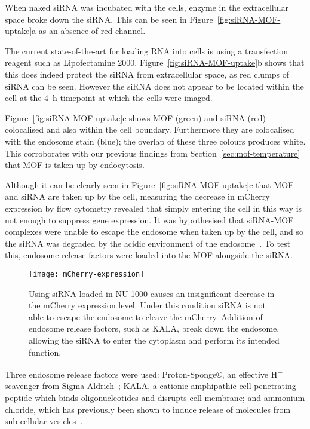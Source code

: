 When naked siRNA was incubated with the cells, enzyme in the extracellular space broke down the siRNA. 
This can be seen in Figure~\ref{fig:siRNA-MOF-uptake}a as an absence of red channel. 

The current state-of-the-art for loading RNA into cells is using a transfection reagent such as Lipofectamine 2000. 
Figure~\ref{fig:siRNA-MOF-uptake}b shows that this does indeed protect the siRNA from extracellular space, as red clumps of siRNA can be seen. 
However the siRNA does not appear to be located within the cell at the \SI{4}{\hour} timepoint at which the cells were imaged. 

Figure~\ref{fig:siRNA-MOF-uptake}c shows MOF (green) and siRNA (red) colocalised and also within the cell boundary. 
Furthermore they are colocalised with the endosome stain (blue); the overlap of these three colours produces white. 
This corroborates with our previous findings from Section~\ref{sec:mof-temperature} that MOF is taken up by endocytosis. 

Although it can be clearly seen in Figure~\ref{fig:siRNA-MOF-uptake}c that MOF and siRNA are taken up by the cell, measuring the decrease in mCherry expression by flow cytometry revealed that simply entering the cell in this way is not enough to suppress gene expression. 
It was hypothesised that siRNA-MOF complexes were unable to escape the endosome when taken up by the cell, and so the siRNA was degraded by the acidic environment of the endosome~\cite{geisow1984ph}. 
To test this, endosome release factors were loaded into the MOF alongside the siRNA. 

\begin{figure}[htbp!]
\centering
\texttt{[image: mCherry-expression]}
\caption[MOFs: siRNA suppresses mCherry expression when an endosome release factor is loaded to MOFs]{ Using siRNA loaded in NU-1000 causes an insignificant decrease in the mCherry expression level. Under this condition siRNA is not able to escape the endosome to cleave the mCherry. Addition of endosome release factors, such as KALA, break down the endosome, allowing the siRNA to enter the cytoplasm and perform its intended function. }
\label{fig:mCherry-expression}
\end{figure}

Three endosome release factors were used: Proton-Sponge®, an effective H\textsuperscript{+} scavenger from Sigma-Aldrich~\cite{ozkar2002nanocluster}; KALA, a cationic amphipathic cell-penetrating peptide which binds oligonucleotides and disrupts cell membrane; and ammonium chloride, which has previously been shown to induce release of molecules from sub-cellular vesicles~\cite{cervia2017distinct}. 

